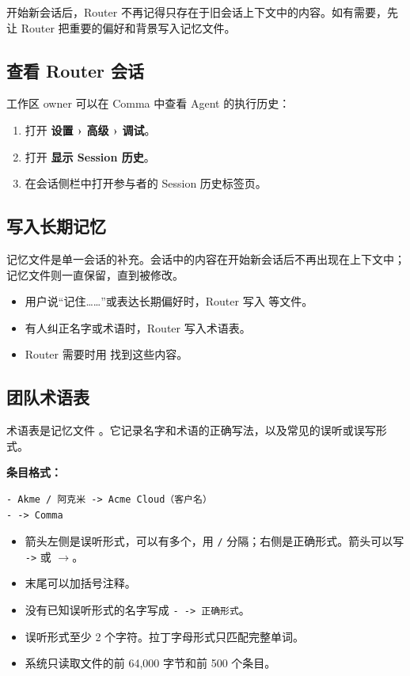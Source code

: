 \documentclass[UTF8,a4paper,11pt]{ctexart}
\begin{document}
\begin{warn}
开始新会话后，Router 不再记得只存在于旧会话上下文中的内容。如有需要，先让 Router 把重要的偏好和背景写入记忆文件。
\end{warn}

\subsection{查看 Router 会话}

工作区 owner 可以在 Comma 中查看 Agent 的执行历史：

\begin{enumerate}
  \item 打开 \textbf{设置 › 高级 › 调试}。
  \item 打开 \textbf{显示 Session 历史}。
  \item 在会话侧栏中打开参与者的 Session 历史标签页。
\end{enumerate}

\subsection{写入长期记忆}\label{sec:learn-memory}

记忆文件是单一会话的补充。会话中的内容在开始新会话后不再出现在上下文中；记忆文件则一直保留，直到被修改。

\begin{itemize}
  \item 用户说“记住……”或表达长期偏好时，Router 写入  等文件。
  \item 有人纠正名字或术语时，Router 写入术语表。
  \item Router 需要时用  找到这些内容。
\end{itemize}

\subsection{团队术语表}\label{sec:glossary}

术语表是记忆文件 。它记录名字和术语的正确写法，以及常见的误听或误写形式。

\textbf{条目格式：}

\begin{Verbatim}[frame=single,fontsize=\small]
- Akme / 阿克米 -> Acme Cloud（客户名）
- -> Comma
\end{Verbatim}

\begin{itemize}
  \item 箭头左侧是误听形式，可以有多个，用 \texttt{/} 分隔；右侧是正确形式。箭头可以写 \texttt{->} 或 $\rightarrow$。
  \item 末尾可以加括号注释。
  \item 没有已知误听形式的名字写成 \texttt{- -> 正确形式}。
  \item 误听形式至少 2 个字符。拉丁字母形式只匹配完整单词。
  \item 系统只读取文件的前 64,000 字节和前 500 个条目。
\end{itemize}
\end{document}
